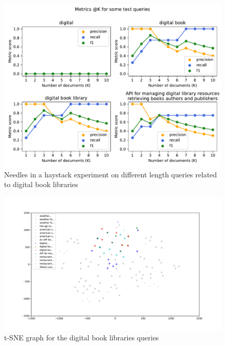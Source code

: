 \begin{figure}[!h]
    \begin{center}
        \includegraphics[width=0.8\linewidth]{assets/pdf/evaluation/prec-rec-library}
    \end{center}

    \caption{Needles in a haystack experiment on different length queries related to digital book libraries}
    \label{fig:nh-4}
\end{figure}

\begin{figure}[!h]
    \begin{center}
        \includegraphics[width=0.8\linewidth]{assets/pdf/evaluation/tsne-books}
    \end{center}

    \caption{t-SNE graph for the digital book libraries queries}
    \label{fig:tsne-4}
\end{figure}


